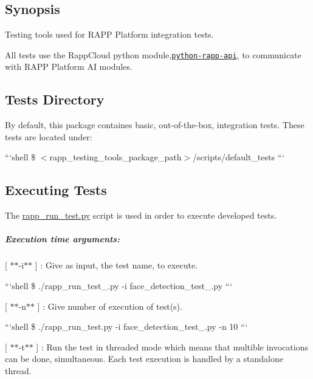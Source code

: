 \subsection*{Synopsis}

Testing tools used for R\-A\-P\-P Platform integration tests.

All tests use the Rapp\-Cloud python module,\href{https://github.com/rapp-project/rapp-api/tree/master/python}{\tt python-\/rapp-\/api}, to communicate with R\-A\-P\-P Platform A\-I modules.

\subsection*{Tests Directory}

By default, this package containes basic, out-\/of-\/the-\/box, integration tests. These tests are located under\-:

```shell \$ $<$rapp\-\_\-testing\-\_\-tools\-\_\-package\-\_\-path$>$/scripts/default\-\_\-tests ```

\subsection*{Executing Tests}

The \hyperlink{rapp__run__test_8py}{rapp\-\_\-run\-\_\-test.\-py} script is used in order to execute developed tests.

\subparagraph*{Execution time arguments\-:}


\begin{DoxyItemize}
\item \mbox{[} $\ast$$\ast$-\/i$\ast$$\ast$ \mbox{]} \-: Give as input, the test name, to execute.
\end{DoxyItemize}

```shell \$ ./rapp\-\_\-run\-\_\-test\-\_\-.py -\/i face\-\_\-detection\-\_\-test\-\_.\-py ```


\begin{DoxyItemize}
\item \mbox{[} $\ast$$\ast$-\/n$\ast$$\ast$ \mbox{]} \-: Give number of execution of test(s).
\end{DoxyItemize}

```shell \$ ./rapp\-\_\-run\-\_\-test.py -\/i face\-\_\-detection\-\_\-test\-\_.\-py -\/n 10 ```


\begin{DoxyItemize}
\item \mbox{[} $\ast$$\ast$-\/t$\ast$$\ast$ \mbox{]} \-: Run the test in threaded mode which means that multible invocations can be done, simultaneous. Each test execution is handled by a standalone thread.
\end{DoxyItemize}

